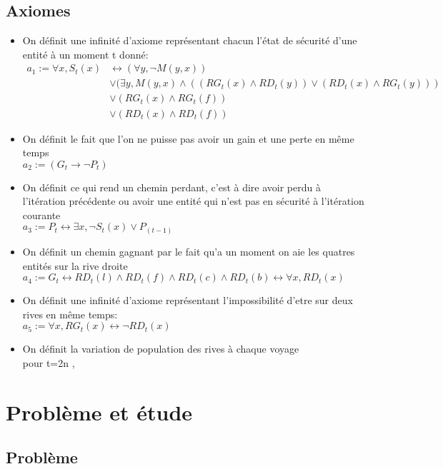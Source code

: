 \documentclass{article}
\begin{document}
\subsection{Axiomes}
\begin{itemize}
  \item \small On définit une infinité d'axiome représentant chacun l'état de sécurité d'une entité à un moment t donné:
  \begin{align*}
    a_1:= \forall x,S_t(x) & \leftrightarrow  (\forall y, \neg M(y,x))\\ &\vee (\exists y , M(y,x) \wedge ((RG_t(x)\wedge RD_t(y)) \vee (RD_t(x)\wedge RG_t(y)))\\
    &\vee (RG_t(x) \wedge RG_t(f))\\
    &\vee (RD_t(x) \wedge RD_t(f))
  \end{align*}
  \item On définit le fait que l'on ne puisse pas avoir un gain et une perte en même temps\\
  $a_2:= (G_t \to \neg P_t)$
  \item On définit ce qui rend un chemin perdant, c'est à dire avoir perdu à l'itération précédente ou avoir une entité qui n'est pas en sécurité à l'itération courante\\
  $a_3:= P_t \leftrightarrow \exists x, \neg S_t(x) \vee P_{(t-1)}$
  \item On définit un chemin gagnant par le fait qu'a un moment on aie les quatres entités sur la rive droite\\
  $a_4:= G_t \leftrightarrow RD_t(l) \wedge RD_t(f) \wedge RD_t(c) \wedge RD_t(b) \leftrightarrow  \forall x, RD_t(x)$
  \item On définit une infinité d'axiome représentant l'impossibilité d'etre sur deux rives en même temps:\\
  $a_5 := \forall x ,RG_t(x) \leftrightarrow \neg RD_t(x)$
  \item On définit la variation de population des rives à chaque voyage\\
  pour t=2n ,
\end{itemize}

\section{Problème et étude}
\subsection{Problème}
\end{document}
